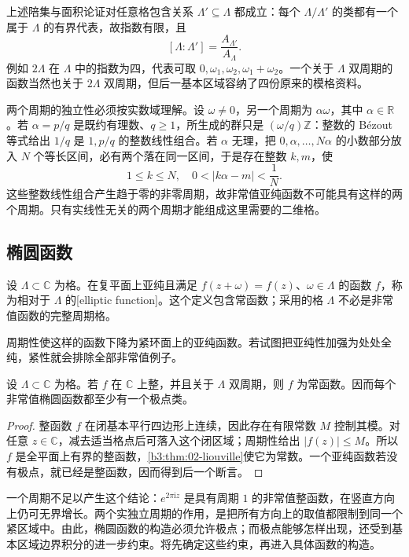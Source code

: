 上述陪集与面积论证对任意格包含关系 \(\Lambda'\subseteq\Lambda\) 都成立：每个 \(\Lambda/\Lambda'\) 的类都有一个属于 \(\Lambda\) 的有界代表，故指数有限，且
\[
 [\Lambda:\Lambda']=\frac{A_{\Lambda'}}{A_\Lambda}.
\]
例如 \(2\Lambda\) 在 \(\Lambda\) 中的指数为四，代表可取 \(0,\omega_1,\omega_2,\omega_1+\omega_2\)。一个关于 \(\Lambda\) 双周期的函数当然也关于 \(2\Lambda\) 双周期，但后一基本区域容纳了四份原来的模格资料。

\ProseParagraphBreak
两个周期的独立性必须按实数域理解。设 \(\omega\ne0\)，另一个周期为 \(\alpha\omega\)，其中 \(\alpha\in\mathbb R\)。若 \(\alpha=p/q\) 是既约有理数、\(q\ge1\)，所生成的群只是 \((\omega/q)\mathbb Z\)：整数的 Bézout 等式给出 \(1/q\) 是 \(1,p/q\) 的整数线性组合。若 \(\alpha\) 无理，把 \(0,\alpha,\ldots,N\alpha\) 的小数部分放入 \(N\) 个等长区间，必有两个落在同一区间，于是存在整数 \(k,m\)，使
\[
 1\le k\le N,
 \quad 0<|k\alpha-m|<\frac1N.
\]
这些整数线性组合产生趋于零的非零周期，故非常值亚纯函数不可能具有这样的两个周期。只有实线性无关的两个周期才能组成这里需要的二维格。

\subsection{椭圆函数}
\label{b3:subsec:220104}

\begin{definition}\label{b3:def:22-elliptic}
设 \(\Lambda\subset\mathbb C\) 为格。在复平面上亚纯且满足 \(f(z+\omega)=f(z)\)、\(\omega\in\Lambda\) 的函数 \(f\)，称为相对于 \(\Lambda\) 的[elliptic function]。这个定义包含常函数；采用的格 \(\Lambda\) 不必是非常值函数的完整周期格。
\end{definition}

周期性使这样的函数下降为紧环面上的亚纯函数。若试图把亚纯性加强为处处全纯，紧性就会排除全部非常值例子。

\begin{proposition}\label{b3:prop:22-entire-constant}
设 \(\Lambda\subset\mathbb C\) 为格。若 \(f\) 在 \(\mathbb C\) 上整，并且关于 \(\Lambda\) 双周期，则 \(f\) 为常函数。因而每个非常值椭圆函数都至少有一个极点类。
\end{proposition}
\begin{proof}
整函数 \(f\) 在闭基本平行四边形上连续，因此存在有限常数 \(M\) 控制其模。对任意 \(z\in\mathbb C\)，减去适当格点后可落入这个闭区域；周期性给出 \(|f(z)|\le M\)。所以 \(f\) 是全平面上有界的整函数，\cref{b3:thm:02-liouville}使它为常数。一个亚纯函数若没有极点，就已经是整函数，因而得到后一个断言。
\end{proof}

一个周期不足以产生这个结论：\(e^{2\pi\mathrm{i}z}\) 是具有周期 \(1\) 的非常值整函数，在竖直方向上仍可无界增长。两个实独立周期的作用，是把所有方向上的取值都限制到同一个紧区域中。由此，椭圆函数的构造必须允许极点；而极点能够怎样出现，还受到基本区域边界积分的进一步约束。将先确定这些约束，再进入具体函数的构造。
